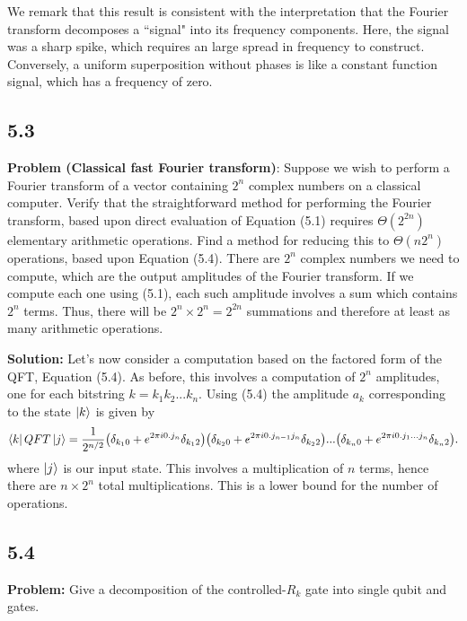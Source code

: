 \documentclass{article}
\begin{document}
We remark that this result is consistent with the interpretation that the Fourier transform decomposes a ``signal" into its frequency components. Here, the signal was a sharp spike, which requires an large spread in frequency to construct. Conversely, a uniform superposition without phases is like a constant function signal, which has a frequency of zero. 

\subsection*{5.3} 
\textbf{Problem (Classical fast Fourier transform)}: Suppose we wish to perform a Fourier transform of a vector containing $2^n$ complex numbers on a classical computer. Verify that the straightforward method for performing the Fourier transform, based upon direct evaluation of Equation (5.1) requires $\Theta(2^{2n})$ elementary arithmetic operations. Find a method for reducing this to $\Theta(n2^n)$ operations, based upon Equation (5.4).
There are $2^n$ complex numbers we need to compute, which are the output amplitudes of the Fourier transform. If we compute each one using (5.1), each such amplitude involves a sum which contains $2^n$ terms. Thus, there will be $2^n \times 2^n = 2^{2n}$ summations and therefore at least as many arithmetic operations.

\textbf{Solution:} Let's now consider a computation based on the factored form of the QFT, Equation (5.4). As before, this involves a computation of $2^n$ amplitudes, one for each bitstring $k = k_1k_2...k_n$. Using (5.4) the amplitude $a_{k}$ corresponding to the state $\ket{k}$ is given by
\begin{align}
    \bra{k}QFT\ket{j} = \frac{1}{2^{n/2}}\big(\delta_{k_1 0}+e^{2\pi i0.j_n}\delta_{k_1 2}\big)\big(\delta_{k_2 0}+e^{2\pi i0.j_{n-1}j_n}\delta_{k_2 2}\big)...\big(\delta_{k_n 0}+e^{2\pi i0.j_1...j_n}\delta_{k_n 2}\big).
\end{align}
where $\ket{j}$ is our input state. This involves a multiplication of $n$ terms, hence there are $n\times 2^n$ total multiplications. This is a lower bound for the number of operations. 

\subsection*{5.4}
\textbf{Problem:} Give a decomposition of the controlled-$R_k$ gate into single qubit and  gates.
\end{document}
